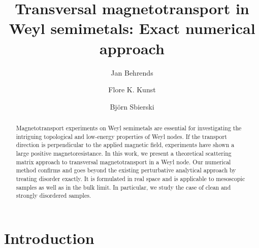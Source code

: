 \documentclass[aps,prb,10pt,amsmath,amssymb,twocolumn,floatfix,superscriptaddress,showpacs,numerical,footinbib]{revtex4-1}
\begin{document}
\title{Transversal magnetotransport in Weyl semimetals: Exact numerical approach}
\author{Jan Behrends}
\author{Flore K. Kunst}
\author{Bj\"orn Sbierski}

\begin{abstract}
%
Magnetotransport experiments on Weyl semimetals are essential for investigating the intriguing topological and low-energy properties of Weyl nodes.
%
If the transport direction is perpendicular to the applied magnetic field, experiments have shown a large positive magnetoresistance.
%
In this work, we present a theoretical scattering matrix approach to transversal magnetotransport in a Weyl node. Our numerical method confirms and goes beyond the existing perturbative analytical approach by treating disorder exactly.
%
It is formulated in real space and is applicable to mesoscopic samples as well as in the bulk limit. In particular, we study the case of clean and strongly disordered samples.    
%
\end{abstract}

\maketitle

\section{Introduction}
\end{document}
